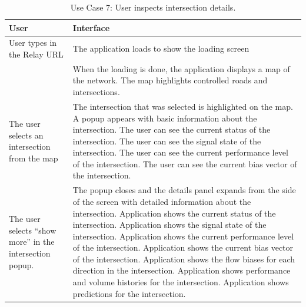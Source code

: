 \documentclass{report}
\begin{document}
\begin{table}[htbp]
\begin{centering}
    \begin{tabular}{| p{7cm} | p{7cm} |}
    \hline
    User    & Interface   \\ \hline
    User types in the Relay URL    &     The application loads to show the loading screen    \\ \hline
    ~      & When the loading is done, the application displays a map of the network. The map highlights controlled roads and intersections. \\ \hline
     The user selects an intersection from the map  &   The intersection that was selected is highlighted on the map. A popup appears with basic information about the intersection. The user can see the current status of the intersection. The user can see the signal state of the intersection. The user can see the current performance level of the intersection. The user can see the current bias vector of the intersection.          \\ \hline
     The user selects ``show more'' in the intersection popup.     &    The popup closes and the details panel expands from the side of the screen with detailed information about the intersection. Application shows the current status of the intersection. Application shows the signal state of the intersection. Application shows the current performance level of the intersection. Application shows the current bias vector of the intersection. Application shows the flow biases for each direction in the intersection. Application shows performance and volume histories for the intersection. Application shows predictions for the intersection. \\ \hline
    \end{tabular}
    \caption {Use Case 7: User inspects intersection details.}
    \label{use-case-7}
   \end{centering}
\end{table}
\end{document}
